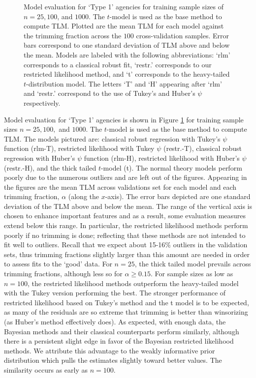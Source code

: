 \documentclass[12pt]{article}
\begin{document}
\begin{figure}
\caption{Model evaluation for `Type 1' agencies for training sample
  sizes of $n=25,100$, and $1000$. The $t$-model is used as the base
  method to compute TLM. Plotted are the mean TLM for each model
  against the trimming fraction across the $100$ cross-validation
  samples. Error bars correspond to one standard deviation of TLM
  above and below the mean. Models are labeled with the following
  abbreviations: `rlm' corresponds to a classical robust fit, `restr.'
  corresponds to our restricted likelihood method, and `t' corresponds to the
  heavy-tailed $t$-distribution model. The letters `T' and `H'
  appearing after `rlm' and `restr.' correspond to the use of  Tukey's
  and Huber's $\psi$ respectively.  
}
\label{fig:Type1Marg}
\end{figure}



Model evaluation for `Type 1' agencies is shown in Figure
\ref{fig:Type1Marg} for training sample sizes $n=25, 100,$ and $1000$.
The $t$-model is used as the base
  method to compute TLM.
The models pictured are: classical robust regression with Tukey's $\psi$ function (rlm-T), restricted likelihood with Tukey $\psi$ (restr.-T), classical robust regression with Huber's $\psi$ function (rlm-H), restricted likelihood  with Huber's $\psi$ (restr.-H), and the thick tailed $t$-model (t). The normal theory models perform poorly due to the numerous outliers
and are left out of the figures. Appearing in the figures are the mean TLM across
validations set for each model and each trimming fraction, $\alpha$ (along the $x$-axis). The error bars depicted are one standard deviation of the TLM above and below the mean.  The range of the vertical axis is chosen to enhance important features and as a result, some evaluation measures extend below this range. In particular, the restricted likelihood methods perform poorly if no trimming is done; reflecting that these methods are not intended to fit well to outliers. Recall that we expect about 15-16\% outliers in the validation sets, thus trimming fractions slightly larger than this amount are needed in order to assess fits to the `good' data. For $n=25$, the thick tailed model  prevails across trimming fractions, although less so for $\alpha\geq 0.15$. For sample sizes as low as $n=100$, the restricted likelihood methods outperform the heavy-tailed model with the Tukey version performing the best.   
The stronger performance of restricted likelihood based on Tukey's method and the t model is to be expected, as many of the 
residuals are so extreme that trimming is better than winsorizing (as Huber's method effectively does).  
As expected, with enough data,  the Bayesian methods and their classical counterparts perform similarly, although there
is a persistent slight edge in favor of the Bayesian restricted likelihood methods.  We attribute this advantage to the weakly informative
prior distribution which pulls the estimates slightly toward better values.  The similarity occurs as early as $n=100$. 
\end{document}
